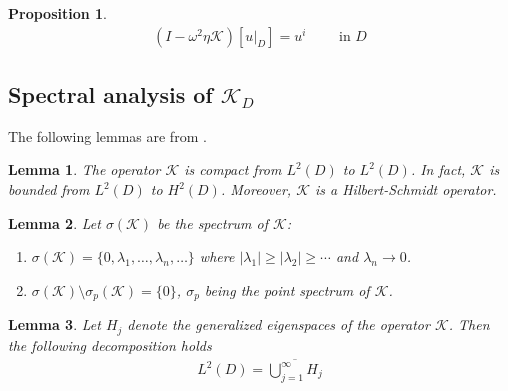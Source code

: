 \documentclass[11pt]{article}
\numberwithin{equation}{section}
\newtheorem{lemma}{Lemma}[section]
\newtheorem{proposition}{Proposition}[section]
\newcommand{\tin}{\text{ in }}
\begin{document}
\begin{proposition}
\begin{align}\label{eq:lippman}
\left( I-\omega^2 \eta \mathcal{K}\right)\left[ u\big\vert_D\right] = u^i \qquad \tin D
\end{align}
\end{proposition}
\subsection{Spectral analysis of $\mathcal{K}_D$}

The following lemmas are from \cite{ammari2015super}. 


\begin{lemma}
The operator $\mathcal{K}$ is compact from $L^2(D)$ to $L^2(D)$. In fact, $\mathcal{K}$ is bounded from $L^2(D)$ to $H^2(D)$. Moreover, $\mathcal{K}$ is a Hilbert-Schmidt operator.
\end{lemma}

\begin{lemma}
Let $\sigma(\mathcal{K})$ be the spectrum of $\mathcal{K}$:
\begin{enumerate}
\item $\sigma(\mathcal{K}) =\{0,\lambda_1,\ldots,\lambda_n,\ldots\}$ where $\vert \lambda_1\vert \geq \vert \lambda_2\vert \geq \cdots$ and $\lambda_n\rightarrow 0$.
\item $\sigma(\mathcal{K})\setminus\sigma_p(\mathcal{K})=\{0\}$, $\sigma_p$ being the point spectrum of $\mathcal{K}$.
\end{enumerate}
\end{lemma}

\begin{lemma}Let $H_j$ denote the generalized eigenspaces of the operator $\mathcal{K}$. Then the following decomposition holds
\begin{align*}
L^2(D)= \overline{\mathop{\bigcup}_{j=1}^\infty H_j}
\end{align*}
\end{lemma}
\end{document}

